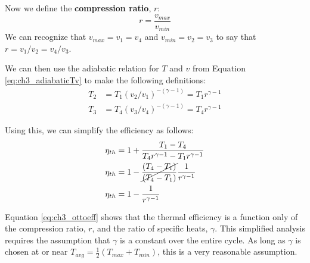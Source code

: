 Now we define the {\bf compression ratio}, $r$:
\begin{equation} \label{eq:ch3_comprat}
  r = \frac{v_{max}}{v_{min}}
\end{equation}
We can recognize that $v_{max}=v_1=v_4$ and $v_{min}=v_2=v_3$ to say that $r=v_1/v_2=v_4/v_3$.

We can then use the adiabatic relation for $T$ and $v$ from Equation \ref{eq:ch3_adiabaticTv} to make the following definitions:
\begin{align*}
  T_2 &= T_1 (v_2/v_1)^{-(\gamma-1)} = T_1 r^{\gamma-1}\\
  T_3 &= T_4 (v_3/v_4)^{-(\gamma-1)} = T_4 r^{\gamma-1}
\end{align*}

Using this, we can simplify the efficiency as follows:
\begin{align}
  \nonumber \eta_{th} &= 1 + \frac{ T_1-T_4}{ T_4 r^{\gamma-1} -T_1 r^{\gamma-1}} \\
  \nonumber \eta_{th} &= 1-\cancel{\frac{\left(T_4 - T_1\right)}{\left(T_4 - T_1\right)}} \frac{1}{r^{\gamma-1}} \\
  \label{eq:ch3_ottoeff} \eta_{th} &= 1 - \frac{1}{r^{\gamma-1}}
\end{align}

Equation \ref{eq:ch3_ottoeff} shows that the thermal efficiency is a function only of the compression ratio, $r$, and the ratio of specific heats, $\gamma$.  This simplified analysis requires the assumption that $\gamma$ is a constant over the entire cycle.  As long as $\gamma$ is chosen at or near $T_{avg}=\frac{1}{2}\left(T_{max}+T_{min}\right)$, this is a very reasonable assumption.

